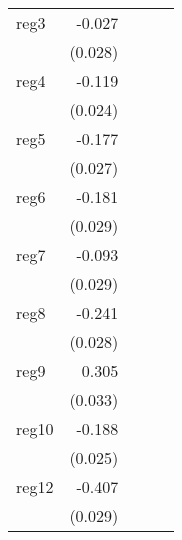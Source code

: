 {\begin{longtable}{l*{4}{D{.}{.}{-1}}}
\addlinespace
reg3        &      -0.027         &                     &                     &                     \\
            &     (0.028)         &                     &                     &                     \\
\addlinespace
reg4        &      -0.119\sym{***}&                     &                     &                     \\
            &     (0.024)         &                     &                     &                     \\
\addlinespace
reg5        &      -0.177\sym{***}&                     &                     &                     \\
            &     (0.027)         &                     &                     &                     \\
\addlinespace
reg6        &      -0.181\sym{***}&                     &                     &                     \\
            &     (0.029)         &                     &                     &                     \\
\addlinespace
reg7        &      -0.093\sym{**} &                     &                     &                     \\
            &     (0.029)         &                     &                     &                     \\
\addlinespace
reg8        &      -0.241\sym{***}&                     &                     &                     \\
            &     (0.028)         &                     &                     &                     \\
\addlinespace
reg9        &       0.305\sym{***}&                     &                     &                     \\
            &     (0.033)         &                     &                     &                     \\
\addlinespace
reg10       &      -0.188\sym{***}&                     &                     &                     \\
            &     (0.025)         &                     &                     &                     \\
\addlinespace
reg12       &      -0.407\sym{***}&                     &                     &                     \\
            &     (0.029)         &                     &                     &                     \\

\end{longtable}}
